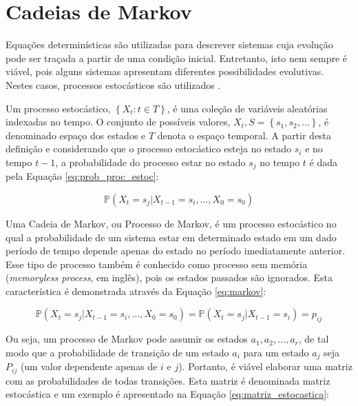\documentclass[msc, classic, a4paper]{ufbathesis}
\begin{document}
\section{Cadeias de Markov}
\label{sec:markov}

Equações determinísticas são utilizadas para descrever sistemas cuja evolução pode ser traçada a partir de uma condição inicial.
Entretanto, isto nem sempre é viável, pois alguns sistemas apresentam diferentes possibilidades evolutivas.
Nestes casos, processos estocásticos são utilizados \cite{taylor1998introduction}.

Um processo estocástico, $\left\{ X _ { t } : t \in T \right\}$, é uma coleção de variáveis aleatórias indexadas no tempo.
O conjunto de possíveis valores, $X_{t}, S = \left\{s_{1}, s_{2}, \ldots\right\}$, é denominado espaço dos estados e $T$ denota o espaço temporal.
A partir desta definição e considerando que o processo estocástico esteja no estado $s_i$ e no tempo $t - 1$, a probabilidade
do processo estar no estado $s_j$ no tempo $t$ é dada pela Equação \ref{eq:prob_proc_estoc}:

\begin{equation}
    \label{eq:prob_proc_estoc}
    \mathbb { P } \left( X _ { t } = s _ { j } | X _ { t - 1 } = s _ { i } , \ldots , X _ { 0 } = s _ { 0 } \right)
\end{equation}


Uma Cadeia de Markov, ou Processo de Markov,
é um processo estocástico no qual a probabilidade de um sistema estar em determinado estado em um dado período de tempo depende apenas do estado no período imediatamente anterior.
Esse tipo de processo também é conhecido como processo sem memória (\textit{memoryless process}, em inglês), pois os estados passados são ignorados.
Esta característica é demonstrada através da Equação \ref{eq:markov}:

\begin{equation}
    \label{eq:markov}
    \mathbb { P } \left( X _ { t } = s _ { j } | X _ { t - 1 } = s _ { i } , \ldots , X _ { 0 } = s _ { 0 } \right) = \mathbb { P } \left( X _ { t } = s _ { j } | X _ { t - 1 } = s _ { i } \right) = p _ { i j }
\end{equation}

Ou seja, um processo de Markov pode assumir os estados $a_1, a_2, \ldots, a_r$, de tal modo que a probabilidade
de transição de um estado $a_i$ para um estado $a_j$ seja $P_{ij}$ (um valor dependente apenas de $i$ e $j$).
Portanto, é viável elaborar uma matriz com as probabilidades de todas transições.
Esta matriz é denominada matriz estocástica e um exemplo é apresentado na Equação \ref{eq:matriz_estocastica}:
\end{document}
